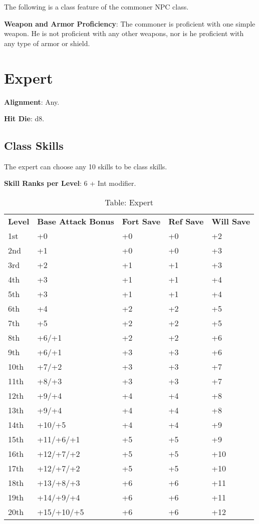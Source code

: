 				
The following is a class feature of the commoner NPC class.
				
\textbf{Weapon and Armor Proficiency}: The commoner is proficient with one simple weapon. He is not proficient with any other weapons, nor is he proficient with any type of armor or shield.
				
\section{Expert}

				
\textbf{Alignment}: Any.
				
\textbf{Hit Die}: d8.
				
\subsection{Class Skills}

				
The expert can choose any 10 skills to be class skills.
				
\textbf{Skill Ranks per Level}: 6 + Int modifier.
				
\begin{table}[]
\sffamily
\caption{Table: Expert}
\begin{tabular}{lllll}
\textbf{Level} & \textbf{Base Attack Bonus} & \textbf{Fort Save} & \textbf{Ref Save} & \textbf{Will Save}\\
1st & +0 & +0 & +0 & +2\\
2nd & +1 & +0 & +0 & +3\\
3rd & +2 & +1 & +1 & +3\\
4th & +3 & +1 & +1 & +4\\
5th & +3 & +1 & +1 & +4\\
6th & +4 & +2 & +2 & +5\\
7th & +5 & +2 & +2 & +5\\
8th & +6/+1 & +2 & +2 & +6\\
9th & +6/+1 & +3 & +3 & +6\\
10th & +7/+2 & +3 & +3 & +7\\
11th & +8/+3 & +3 & +3 & +7\\
12th & +9/+4 & +4 & +4 & +8\\
13th & +9/+4 & +4 & +4 & +8\\
14th & +10/+5 & +4 & +4 & +9\\
15th & +11/+6/+1 & +5 & +5 & +9\\
16th & +12/+7/+2 & +5 & +5 & +10\\
17th & +12/+7/+2 & +5 & +5 & +10\\
18th & +13/+8/+3 & +6 & +6 & +11\\
19th & +14/+9/+4 & +6 & +6 & +11\\
20th & +15/+10/+5 & +6 & +6 & +12\\
\end{tabular}
\end{table}
			
